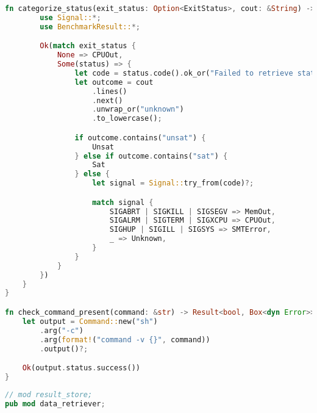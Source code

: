 \begin{lstlisting}[language=rust, caption={benchmark/runner.rs}]
	fn categorize_status(exit_status: Option<ExitStatus>, cout: &String) -> Result<BenchmarkResult, Box<dyn Error>> {
		use Signal::*;
		use BenchmarkResult::*;

		Ok(match exit_status {
			None => CPUOut,
			Some(status) => {
				let code = status.code().ok_or("Failed to retrieve status code!")?;
				let outcome = cout
					.lines()
					.next()
					.unwrap_or("unknown")
					.to_lowercase();

				if outcome.contains("unsat") {
					Unsat
				} else if outcome.contains("sat") {
					Sat
				} else {
					let signal = Signal::try_from(code)?;

					match signal {
						SIGABRT | SIGKILL | SIGSEGV => MemOut,
						SIGALRM | SIGTERM | SIGXCPU => CPUOut,
						SIGHUP | SIGILL | SIGSYS => SMTError,
						_ => Unknown,
					}
				}
			}
		})
	}
}

fn check_command_present(command: &str) -> Result<bool, Box<dyn Error>> {
	let output = Command::new("sh")
		.arg("-c")
		.arg(format!("command -v {}", command))
		.output()?;

	Ok(output.status.success())
}
\end{lstlisting}

\begin{lstlisting}[language=rust, caption={data/mod.rs}]
// mod result_store;
pub mod data_retriever;
\end{lstlisting}

